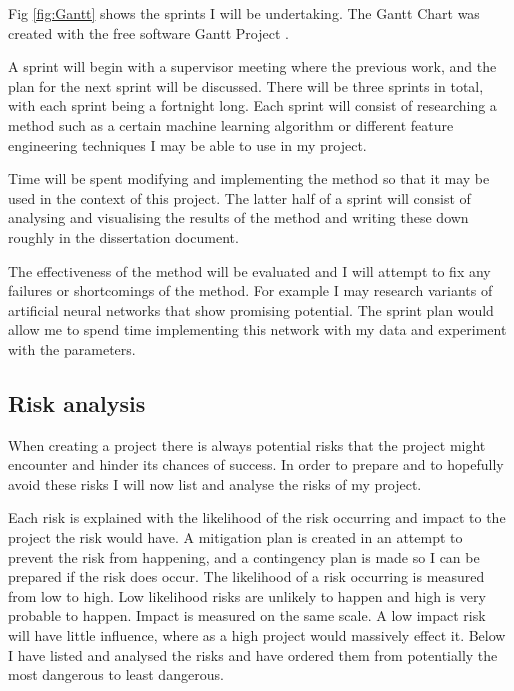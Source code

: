 \documentclass{article}
\begin{document}
Fig \ref{fig:Gantt} shows the sprints I will be undertaking.
The Gantt Chart was created with the free software Gantt Project \cite{GanttProject}.

A sprint will begin with a supervisor meeting where the previous work, and the plan for the next sprint will be discussed.
There will be three sprints in total, with each sprint being a fortnight long.
Each sprint will consist of researching a method such as a certain machine learning algorithm or different feature engineering techniques I may be able to use in my project.

Time will be spent modifying and implementing the method so that it may be used in the context of this project.
The latter half of a sprint will consist of analysing and visualising the results of the method and writing these down roughly in the dissertation document.

The effectiveness of the method will be evaluated and I will attempt to fix any failures or shortcomings of the method.
For example I may research variants of artificial neural networks that show promising potential.
The sprint plan would allow me to spend time implementing this network with my data and experiment with the parameters.  




\subsection{Risk analysis}
When creating a project there is always potential risks that the project might encounter and hinder its chances of success. 
In order to prepare and to hopefully avoid these risks I will now list and analyse the risks of my project.

Each risk is explained with the likelihood of the risk occurring and impact to the project the risk would have.
A mitigation plan is created in an attempt to prevent the risk from happening, and a contingency plan is made so I can be prepared if the risk does occur.
The likelihood of a risk occurring is measured from low to high.
Low likelihood risks are unlikely to happen and high is very probable to happen. 
Impact is measured on the same scale.
A low impact risk will have little influence, where as a high project would massively effect it.
Below I have listed and analysed the risks and have ordered them from potentially the most dangerous to least dangerous. 
\end{document}
